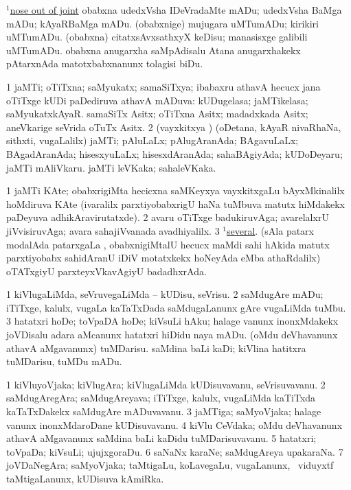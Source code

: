 \noindent
\gl{\nuga}
\bmng
{} \hyperref{kandict_n.pdf}{N}{nose(1) pagu(21)}{$^1$nose out of joint} 
\banum
{} obabxna udedxVsha IDeVradaMte mADu; udedxVsha BaMga mADu; kAyaRBaMga mADu. 
 (obabxnige) mujugara uMTumADu; kirikiri uMTumADu. 
 (obabxna) citatxsAvxsathxyX keDisu; manasisxge galibili uMTumADu. 
 obabxna anugarxha saMpAdisalu Atana anugarxhakekx pAtarxnAda matotxbabxnanunx tolagisi biDu. 
\eanum
\emng
\eentry

\bentry
{}
\gl{\gu}
\bmng
\bnum
\num{1} jaMTi; oTiTxna; saMyukatx; samaSiTxya; ibabaxru athavA hecucx jana oTiTxge kUDi paDediruva athavA mADuva:   kUDugelasa; jaMTikelasa; saMyukatxkAyaR.   samaSiTx Asitx; oTiTxna Asitx; madadxkada Asitx; aneVkarige seVrida oTuTx Asitx. 
\num{2} (vayxkitxya \vi) (oDetana, kAyaR nivaRhaNa, sithxti, \mo vugaLalilx) jaMTi; pAluLaLx; pAlugAranAda; BAgavuLaLx; BAgadAranAda; hisesxyuLaLx; hisesxdAranAda; sahaBAgiyAda;   kUDoDeyaru; jaMTi mAliVkaru.   jaMTi leVKaka; sahaleVKaka. 
\enum
\emng

\noindent
\gl{\pagu}
\bmng
\bnum
\num{1}   jaMTi KAte; obabxrigiMta hecicxna saMKeyxya vayxkitxgaLu bAyxMkinalilx hoMdiruva KAte (ivaralilx parxtiyobabxrigU haNa tuMbuva matutx hiMdakekx paDeyuva adhikAravirutatxde). 
\num{2}  avaru oTiTxge badukiruvAga; avarelalxrU jiVvisiruvAga; avara sahajiVvanada avadhiyalilx. 
\num{3}  \hyperref{kandict_s.pdf}{S}{several(1) pagu(2)}{$^1$several}. (sAla patarx modalAda patarxgaLa \vi, obabxnigiMtalU hecucx maMdi sahi hAkida matutx parxtiyobabx sahidAranU iDiV motatxkekx hoNeyAda eMba athaRdalilx) oTATxgiyU parxteyxVkavAgiyU badadhxrAda. 
\enum
\emng
\eentry

\bentry
{}
\gl{\sakirx}
\bmng
\bnum
\num{1} kiVlugaLiMda, seVruvegaLiMda -- kUDisu, seVrisu. 
\num{2} saMdugAre mADu; iTiTxge, kalulx, \mo vugaLa kaTaTxDada saMdugaLanunx gAre \mo vugaLiMda tuMbu. 
\num{3} hatatxri hoDe; toVpaDA hoDe; kiVsuLi hAku; halage \mo vanunx inonxMdakekx joVDisalu adara aMcanunx hatatxri hiDidu naya mADu. 
 (oMdu deVhavanunx athavA aMgavanunx) 
\banum
{} tuMDarisu. 
 saMdina baLi kaDi; kiVlina hatitxra tuMDarisu, tuMDu mADu. 
\eanum
\numie
\enum
\emng
\eentry

\bentry
{}
\gl{\nA}
\bmng
\bnum
\num{1} kiVluyoVjaka; kiVlugAra; kiVlugaLiMda kUDisuvavanu, seVrisuvavanu. 
\num{2} saMdugAregAra; saMdugAreyava; iTiTxge, kalulx, \mo vugaLiMda kaTiTxda kaTaTxDakekx saMdugAre mADuvavanu. 
\num{3} jaMTiga; saMyoVjaka; halage \mo vanunx inonxMdaroDane kUDisuvavanu. 
\num{4} kiVlu CeVdaka; oMdu deVhavanunx athavA aMgavanunx saMdina baLi kaDidu tuMDarisuvavanu. 
\num{5} hatatxri; toVpaDa; kiVsuLi; ujujxgoraDu. 
\num{6} saNaNx karaNe; saMdugAreya upakaraNa. 
\num{7} joVDaNegAra; saMyoVjaka; taMtigaLu, koLavegaLu, \mo vugaLanunx, \kanmu\ viduyxtf taMtigaLanunx, kUDisuva kAmiRka. 
\enum
\emng
\eentry


